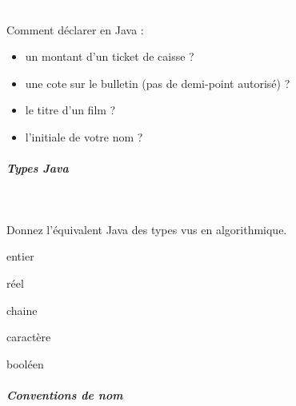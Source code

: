 \documentclass[11pt,a4paper]{article}
\begin{document}
                \textcolor{white}{.} \par
             
								Comment d\'eclarer en Java :
							
					\begin{itemize}
				
			\item un montant d'un ticket de caisse ?  \textcolor{gray}{\underline{\hspace*{10em}}} 
			\item une cote sur le bulletin (pas de demi-point autoris\'e) ?  \textcolor{gray}{\underline{\hspace*{10em}}} 
			\item le titre d'un film ? \textcolor{gray}{\underline{\hspace*{10em}}} 
			\item l'initiale de votre nom ? \textcolor{gray}{\underline{\hspace*{10em}}} 
					\end{itemize}
				
			
		\subparagraph{Types Java} 
		
                \textcolor{white}{.} \par
            
                  Donnez l'\'equivalent Java des types vus en algorithmique. 
                
            \par
         
                entier 		 \textcolor{gray}{\underline{\hspace*{2em}}} \par
				
                r\'eel   		 \textcolor{gray}{\underline{\hspace*{5em}}} \par
				
                chaine 		 \textcolor{gray}{\underline{\hspace*{5em}}} \par
				
                caract\`ere	 \textcolor{gray}{\underline{\hspace*{3em}}} \par
				
                bool\'een      \textcolor{gray}{\underline{\hspace*{5em}}} \par
				
			
		\subparagraph{Conventions de nom} 
		
\end{document}
